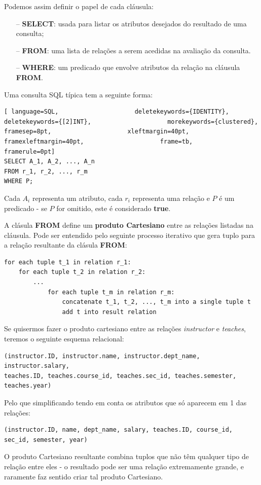 \documentclass[oneside]{book}
\theoremstyle{definition}
\begin{document}
Podemos assim definir o papel de cada cláusula:
\begin{itemize}
    \itemsep0cm
    \item[--]\textbf{SELECT}: usada para listar os atributos desejados do resultado de uma consulta;
    \item[--]\textbf{FROM}: uma lista de relações a serem acedidas na avaliação da consulta.
    \item[--]\textbf{WHERE}: um predicado que envolve atributos da relação na cláusula \textbf{FROM}.
\end{itemize}

Uma consulta SQL típica tem a seguinte forma:
\begin{lstlisting}[ language=SQL,                     deletekeywords={IDENTITY},                     deletekeywords={[2]INT},                     morekeywords={clustered},                     framesep=8pt,                     xleftmargin=40pt,                     framexleftmargin=40pt,                     frame=tb,                     framerule=0pt]
SELECT A_1, A_2, ..., A_n
FROM r_1, r_2, ..., r_m
WHERE P;
\end{lstlisting}
Cada $A_i$ representa um atributo, cada $r_i$ representa uma relação e $P$ é um predicado - se $P$ for omitido, este é considerado \textbf{true}.

A clásula \textbf{FROM} define um \textbf{produto Cartesiano} entre as relações listadas na cláusula. Pode ser entendido pelo seguinte processo iterativo que gera tuplo para a relação resultante da clásula \textbf{FROM}:
\begin{verbatim}
for each tuple t_1 in relation r_1:
    for each tuple t_2 in relation r_2:
        ...
            for each tuple t_m in relation r_m:
                concatenate t_1, t_2, ..., t_m into a single tuple t
                add t into result relation   
\end{verbatim}

Se quisermos fazer o produto cartesiano entre as relações \textit{instructor} e \textit{teaches}, teremos o seguinte esquema relacional:
\begin{verbatim}
(instructor.ID, instructor.name, instructor.dept_name, instructor.salary,
teaches.ID, teaches.course_id, teaches.sec_id, teaches.semester, teaches.year)
\end{verbatim}
Pelo que simplificando tendo em conta os atributos que só aparecem em 1 das relações:
\begin{verbatim}
(instructor.ID, name, dept_name, salary, teaches.ID, course_id, sec_id, semester, year)
\end{verbatim}
O produto Cartesiano resultante combina tuplos que não têm qualquer tipo de relação entre eles - o resultado pode ser uma relação extremamente grande, e raramente faz sentido criar tal produto Cartesiano.
\end{document}
